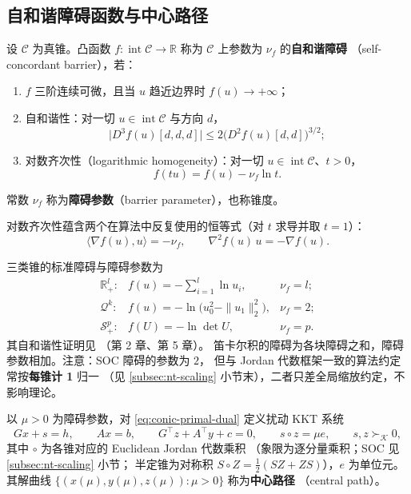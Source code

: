 \subsection{自和谐障碍函数与中心路径}

\begin{definition}[自和谐障碍]
设 $\mathcal{C}$ 为真锥。凸函数 $f : \operatorname{int}\mathcal{C} \to \mathbb{R}$
称为 $\mathcal{C}$ 上参数为 $\nu_f$ 的\textbf{自和谐障碍}
（self-concordant barrier），若：
\begin{enumerate}
  \item $f$ 三阶连续可微，且当 $u$ 趋近边界时 $f(u) \to +\infty$；
  \item 自和谐性：对一切 $u \in \operatorname{int}\mathcal{C}$ 与方向 $d$，
        \[
        \big| D^3 f(u)[d,d,d] \big| \le 2 \big( D^2 f(u)[d,d] \big)^{3/2};
        \]
  \item 对数齐次性（logarithmic homogeneity）：对一切 $u \in \operatorname{int}\mathcal{C}$、$t > 0$，
        \[
        f(tu) = f(u) - \nu_f \ln t.
        \]
\end{enumerate}
常数 $\nu_f$ 称为\textbf{障碍参数}（barrier parameter），也称锥度。
\end{definition}

对数齐次性蕴含两个在算法中反复使用的恒等式（对 $t$ 求导并取 $t = 1$）：
\[
\langle \nabla f(u), u \rangle = -\nu_f, \qquad
\nabla^2 f(u)\, u = -\nabla f(u).
\]

三类锥的标准障碍与障碍参数为
\begin{equation}
\label{eq:conic-barriers}
\begin{array}{lll}
\mathbb{R}^l_+: & f(u) = -\sum_{i=1}^{l} \ln u_i, & \nu_f = l;\\[2pt]
\mathcal{Q}^k: & f(u) = -\ln\big(u_0^2 - \|u_1\|_2^2\big), & \nu_f = 2;\\[2pt]
\mathcal{S}^p_+: & f(U) = -\ln\det U, & \nu_f = p.
\end{array}
\end{equation}
其自和谐性证明见 \cite{nesterov1994}（第 2 章、第 5 章）。
笛卡尔积的障碍为各块障碍之和，障碍参数相加。注意：SOC 障碍的参数为 $2$，
但与 Jordan 代数框架一致的算法约定常按\textbf{每锥计 1} 归一
（见 \ref{subsec:nt-scaling} 小节末），二者只差全局缩放约定，不影响理论。

\begin{definition}[中心路径]
以 $\mu > 0$ 为障碍参数，对 \eqref{eq:conic-primal-dual} 定义扰动 KKT 系统
\[
Gx + s = h, \qquad Ax = b, \qquad G^\top z + A^\top y + c = 0, \qquad
s \circ z = \mu e, \qquad s, z \succ_{\mathcal{K}} 0,
\]
其中 $\circ$ 为各锥对应的 Euclidean Jordan 代数乘积
（象限为逐分量乘积；SOC 见 \ref{subsec:nt-scaling} 小节；
半定锥为对称积 $S \circ Z = \tfrac12(SZ + ZS)$），$e$ 为单位元。
其解曲线 $\{(x(\mu), y(\mu), z(\mu)) : \mu > 0\}$ 称为\textbf{中心路径}
（central path）。
\end{definition}


